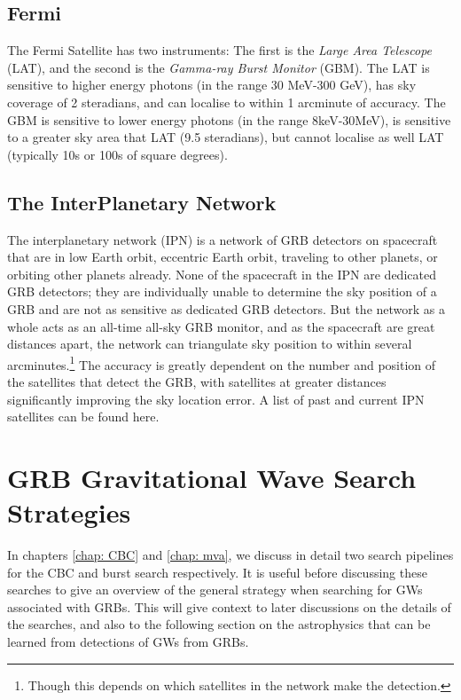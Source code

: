 \documentclass[11pt]{cuthesis}
\begin{document}
\subsection{Fermi}
The Fermi Satellite\cite{fermi} has two instruments: The first is the \textit{Large Area Telescope} (LAT), and the second is the \textit{Gamma-ray Burst Monitor} (GBM). The LAT is sensitive to higher energy photons (in the range 30 MeV-300 GeV), has sky coverage of  2 steradians, and can localise to within 1 arcminute of accuracy. The GBM is sensitive to lower energy photons (in the range 8keV-30MeV), is sensitive to a greater sky area that LAT (9.5 steradians), but cannot localise as well LAT (typically 10s or 100s of square degrees). 

\subsection{The InterPlanetary Network}
The interplanetary network (IPN)\cite{IPN} is a network of GRB detectors on spacecraft that are in low Earth orbit, eccentric Earth orbit, traveling to other planets, or orbiting other planets already. None of the spacecraft in the IPN are dedicated GRB detectors; they are individually unable to determine the sky position of a GRB and are not as sensitive as dedicated GRB detectors. But the network as a whole acts as an all-time all-sky GRB monitor, and as the spacecraft are great distances apart, the network can triangulate sky position to within several arcminutes.\footnote{Though this depends on which satellites in the network make the detection.} The accuracy is greatly dependent on the number and position of the satellites that detect the GRB, with satellites at greater distances significantly improving the sky location error. A list of past and current IPN satellites can be found here.\cite{IPN_list}

\section{GRB Gravitational Wave Search Strategies}
In chapters \ref{chap: CBC} and \ref{chap: mva}, we discuss in detail two search pipelines for the CBC and burst search respectively. It is useful before discussing these searches to give an overview of the general strategy when searching for GWs associated with GRBs. This will give context to later discussions on the details of the searches, and also to the following section on the astrophysics that can be learned from detections of GWs from GRBs. 
\end{document}
